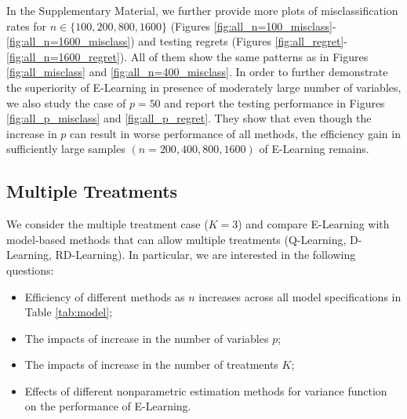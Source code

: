\documentclass[11pt]{article}
\theoremstyle{definition}
\theoremstyle{remark}
\begin{document}
In the Supplementary Material, we further provide more plots of misclassification rates for $ n \in \{ 100,200,800,1600 \} $ (Figures \ref{fig:all_n=100_misclass}-\ref{fig:all_n=1600_misclass}) and testing regrets (Figures \ref{fig:all_regret}-\ref{fig:all_n=1600_regret}). All of them show the same patterns as in Figures \ref{fig:all_misclass} and \ref{fig:all_n=400_misclass}.
In order to further demonstrate the superiority of E-Learning in presence of moderately large number of variables, we also study the case of $ p = 50 $ and report the testing performance in Figures \ref{fig:all_p_misclass} and \ref{fig:all_p_regret}. They show that even though the increase in $ p $ can result in worse performance of all methods, the efficiency gain in sufficiently large samples $ (n = 200,400,800,1600) $ of E-Learning remains.

\subsection{Multiple Treatments}\label{sec:simulation_multiple}
We consider the multiple treatment case ($ K = 3 $) and compare E-Learning with model-based methods that can allow multiple treatments (Q-Learning, D-Learning, RD-Learning). In particular, we are interested in the following questions:
\begin{itemize}
	\item [(\Romannum{1})] Efficiency of different methods as $ n $ increases across all model specifications in Table \ref{tab:model};
	
	\item [(\Romannum{2})] The impacts of increase in the number of variables $ p $;
	
	\item [(\Romannum{3})] The impacts of increase in the number of treatments $ K $;
	
	\item [(\Romannum{4})] Effects of different nonparametric estimation methods for variance function on the performance of E-Learning.
\end{itemize}
\end{document}
